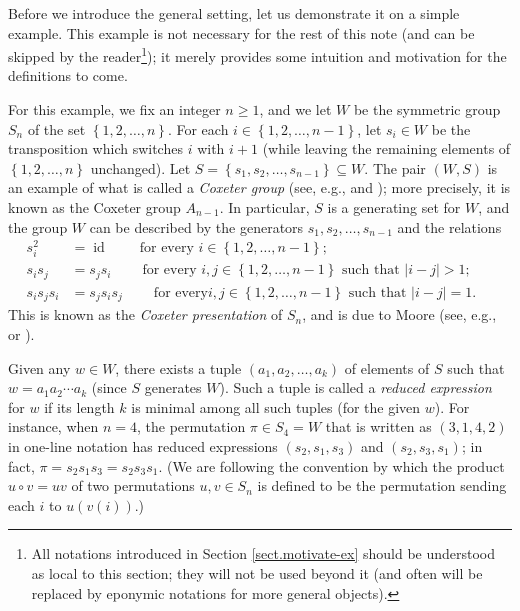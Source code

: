 \documentclass[numbers=enddot,12pt,final,onecolumn,notitlepage,abstracton]{scrartcl}%
\theoremstyle{definition}
\newtheorem{exmp}[theo]{Example}
\newenvironment{example}[1][]
{\begin{exmp}[#1]\begin{leftbar}}
{\end{leftbar}\end{exmp}}
\begin{document}
Before we introduce the general setting, let us demonstrate it on a simple
example. This example is not necessary for the rest of this note (and can be
skipped by the reader\footnote{All notations introduced in Section
\ref{sect.motivate-ex} should be understood as local to this section; they
will not be used beyond it (and often will be replaced by eponymic notations
for more general objects).}); it merely provides some intuition and motivation
for the definitions to come.

For this example, we fix an integer $n\geq1$, and we let $W$ be the symmetric
group $S_{n}$ of the set $\left\{  1,2,\ldots,n\right\}  $. For each
$i\in\left\{  1,2,\ldots,n-1\right\}  $, let $s_{i}\in W$ be the transposition
which switches $i$ with $i+1$ (while leaving the remaining elements of
$\left\{  1,2,\ldots,n\right\}  $ unchanged). Let $S=\left\{  s_{1}%
,s_{2},\ldots,s_{n-1}\right\}  \subseteq W$. The pair $\left(  W,S\right)  $
is an example of what is called a \emph{Coxeter group} (see, e.g.,
\cite[Chapter 4]{Bourbaki4-6} and \cite[\S 1]{Lusztig-Hecke}); more precisely,
it is known as the Coxeter group $A_{n-1}$. In particular, $S$ is a generating
set for $W$, and the group $W$ can be described by the generators $s_{1}%
,s_{2},\ldots,s_{n-1}$ and the relations%
\begin{align}
s_{i}^{2}  &  =\operatorname*{id}\ \ \ \ \ \ \ \ \ \ \text{for every }%
i\in\left\{  1,2,\ldots,n-1\right\}
;\ \ \ \ \ \ \ \ \ \ \label{eq.exam.A3.quad}\\
s_{i}s_{j}  &  =s_{j}s_{i}\ \ \ \ \ \ \ \ \ \ \text{for every }i,j\in\left\{
1,2,\ldots,n-1\right\}  \text{ such that }\left\vert i-j\right\vert
>1;\ \ \ \ \ \ \ \label{eq.exam.A3.braid1}\\
s_{i}s_{j}s_{i}  &  =s_{j}s_{i}s_{j}\ \ \ \ \ \ \ \ \ \ \text{for every
}i,j\in\left\{  1,2,\ldots,n-1\right\}  \text{ such that }\left\vert
i-j\right\vert =1.\ \ \ \ \ \label{eq.exam.A3.braid2}%
\end{align}
This is known as the \emph{Coxeter presentation} of $S_{n}$, and is due to
Moore (see, e.g., \cite[(6.23)--(6.25)]{CoxMos80} or \cite[Theorem
1.2.4]{Williamson}).

Given any $w\in W$, there exists a tuple $\left(  a_{1},a_{2},\ldots
,a_{k}\right)  $ of elements of $S$ such that $w=a_{1}a_{2}\cdots a_{k}$
(since $S$ generates $W$). Such a tuple is called a \emph{reduced expression}
for $w$ if its length $k$ is minimal among all such tuples (for the given
$w$). For instance, when $n=4$, the permutation $\pi\in S_{4}=W$ that is
written as $\left(  3,1,4,2\right)  $ in one-line notation has reduced
expressions $\left(  s_{2},s_{1},s_{3}\right)  $ and $\left(  s_{2}%
,s_{3},s_{1}\right)  $; in fact, $\pi=s_{2}s_{1}s_{3}=s_{2}s_{3}s_{1}$. (We
are following the convention by which the product $u\circ v=uv$ of two
permutations $u,v\in S_{n}$ is defined to be the permutation sending each $i$
to $u\left(  v\left(  i\right)  \right)  $.)
\end{document}
